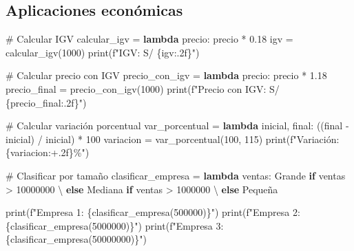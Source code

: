 \documentclass[
  doc,
  floatsintext,
  longtable,
  a4paper,
  nolmodern,
  notxfonts,
  notimes,
  12pt,
  colorlinks=true,linkcolor=blue,citecolor=blue,urlcolor=blue]{apa7}
\newenvironment{Shaded}{\begin{snugshade}}{\end{snugshade}}
\newcommand{\BuiltInTok}[1]{\textcolor[rgb]{0.00,0.23,0.31}{#1}}
\newcommand{\CommentTok}[1]{\textcolor[rgb]{0.37,0.37,0.37}{#1}}
\newcommand{\ControlFlowTok}[1]{\textcolor[rgb]{0.00,0.23,0.31}{\textbf{#1}}}
\newcommand{\DecValTok}[1]{\textcolor[rgb]{0.68,0.00,0.00}{#1}}
\newcommand{\FloatTok}[1]{\textcolor[rgb]{0.68,0.00,0.00}{#1}}
\newcommand{\KeywordTok}[1]{\textcolor[rgb]{0.00,0.23,0.31}{\textbf{#1}}}
\newcommand{\NormalTok}[1]{\textcolor[rgb]{0.00,0.23,0.31}{#1}}
\newcommand{\OperatorTok}[1]{\textcolor[rgb]{0.37,0.37,0.37}{#1}}
\newcommand{\SpecialCharTok}[1]{\textcolor[rgb]{0.37,0.37,0.37}{#1}}
\newcommand{\SpecialStringTok}[1]{\textcolor[rgb]{0.13,0.47,0.30}{#1}}
\newcommand{\StringTok}[1]{\textcolor[rgb]{0.13,0.47,0.30}{#1}}
\begin{document}
\subsection{Aplicaciones económicas}\label{aplicaciones-econuxf3micas}

\begin{Shaded}
\begin{Highlighting}[]
\CommentTok{\# Calcular IGV}
\NormalTok{calcular\_igv }\OperatorTok{=} \KeywordTok{lambda}\NormalTok{ precio: precio }\OperatorTok{*} \FloatTok{0.18}
\NormalTok{igv }\OperatorTok{=}\NormalTok{ calcular\_igv(}\DecValTok{1000}\NormalTok{)}
\BuiltInTok{print}\NormalTok{(}\SpecialStringTok{f"IGV: S/ }\SpecialCharTok{\{}\NormalTok{igv}\SpecialCharTok{:.2f\}}\SpecialStringTok{"}\NormalTok{)}

\CommentTok{\# Calcular precio con IGV}
\NormalTok{precio\_con\_igv }\OperatorTok{=} \KeywordTok{lambda}\NormalTok{ precio: precio }\OperatorTok{*} \FloatTok{1.18}
\NormalTok{precio\_final }\OperatorTok{=}\NormalTok{ precio\_con\_igv(}\DecValTok{1000}\NormalTok{)}
\BuiltInTok{print}\NormalTok{(}\SpecialStringTok{f"Precio con IGV: S/ }\SpecialCharTok{\{}\NormalTok{precio\_final}\SpecialCharTok{:.2f\}}\SpecialStringTok{"}\NormalTok{)}

\CommentTok{\# Calcular variación porcentual}
\NormalTok{var\_porcentual }\OperatorTok{=} \KeywordTok{lambda}\NormalTok{ inicial, final: ((final }\OperatorTok{{-}}\NormalTok{ inicial) }\OperatorTok{/}\NormalTok{ inicial) }\OperatorTok{*} \DecValTok{100}
\NormalTok{variacion }\OperatorTok{=}\NormalTok{ var\_porcentual(}\DecValTok{100}\NormalTok{, }\DecValTok{115}\NormalTok{)}
\BuiltInTok{print}\NormalTok{(}\SpecialStringTok{f"Variación: }\SpecialCharTok{\{}\NormalTok{variacion}\SpecialCharTok{:+.2f\}}\SpecialStringTok{\%"}\NormalTok{)}

\CommentTok{\# Clasificar por tamaño}
\NormalTok{clasificar\_empresa }\OperatorTok{=} \KeywordTok{lambda}\NormalTok{ ventas: }\StringTok{\textquotesingle{}Grande\textquotesingle{}} \ControlFlowTok{if}\NormalTok{ ventas }\OperatorTok{\textgreater{}} \DecValTok{10000000} \OperatorTok{\textbackslash{}}
                                    \ControlFlowTok{else} \StringTok{\textquotesingle{}Mediana\textquotesingle{}} \ControlFlowTok{if}\NormalTok{ ventas }\OperatorTok{\textgreater{}} \DecValTok{1000000} \OperatorTok{\textbackslash{}}
                                    \ControlFlowTok{else} \StringTok{\textquotesingle{}Pequeña\textquotesingle{}}

\BuiltInTok{print}\NormalTok{(}\SpecialStringTok{f"Empresa 1: }\SpecialCharTok{\{}\NormalTok{clasificar\_empresa(}\DecValTok{500000}\NormalTok{)}\SpecialCharTok{\}}\SpecialStringTok{"}\NormalTok{)}
\BuiltInTok{print}\NormalTok{(}\SpecialStringTok{f"Empresa 2: }\SpecialCharTok{\{}\NormalTok{clasificar\_empresa(}\DecValTok{5000000}\NormalTok{)}\SpecialCharTok{\}}\SpecialStringTok{"}\NormalTok{)}
\BuiltInTok{print}\NormalTok{(}\SpecialStringTok{f"Empresa 3: }\SpecialCharTok{\{}\NormalTok{clasificar\_empresa(}\DecValTok{50000000}\NormalTok{)}\SpecialCharTok{\}}\SpecialStringTok{"}\NormalTok{)}
\end{Highlighting}
\end{Shaded}
\end{document}
